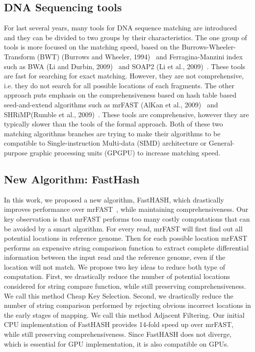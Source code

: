 \subsection{DNA Sequencing tools} For last several years, many tools for DNA
sequence matching are introduced~\cite{tools} and they can be divided to two
groups by their characteristics. The one group of tools is more focused on the
matching speed, based on the Burrows-Wheeler-Transform (BWT) (Burrows and
Wheeler, 1994)~\cite{Burrows94ablock-sorting} and Ferragina-Manzini
index~\cite{Ferragina07compressedrepresentations} such as BWA (Li and Durbin,
2009)~\cite{bwa} and SOAP2 (Li et al., 2009)~\cite{soap2}. These tools are fast
for searching for exact matching. However, they are not comprehensive, i.e.
they do not search for all possible locations of each fragments. The other
approach puts emphasis on the comprehensiveness based on hash table based
seed-and-extend algorithms such as mrFAST (AlKan et al., 2009)~\cite{mrFast}
and SHRiMP(Rumble et al., 2009)~\cite{shrimp}. These tools are comprehensive,
however they are typically slower than the tools of the formal approach. Both
of these two matching algorithms branches are trying to make their algorithms
to be compatible to Single-instruction Multi-data (SIMD) architecture or
General-purpose graphic processing units (GPGPU) to increase matching speed. \\

\subsection{New Algorithm: FastHash} In this work, we proposed a new algorithm,
FastHASH, which drastically improves performance over mrFAST~\cite{mrFast},
while maintaining comprehensiveness. Our key observation is that mrFAST
performs too many costly computations that can be avoided by a smart algorithm.
For every read, mrFAST will first find out all potential locations in reference
genome. Then for each possible location mrFAST performs an expensive string
comparison function to extract complete differential information between the
input read and the reference genome, even if the location will not match. We
propose two key ideas to reduce both type of computation. First, we drastically
reduce the number of potential locations considered for string compare
function, while still preserving comprehensiveness. We call this method Cheap
Key Selection. Second, we drastically reduce the number of string comparison
performed by rejecting obvious incorrect locations in the early stages of
mapping. We call this method Adjacent Filtering. Our initial CPU implementation
of FastHASH provides 14-fold speed up over mrFAST, while still preserving
comprehensiveness. Since FastHASH does not diverge, which is essential for GPU
implementation, it is also compatible on GPUs. \\

